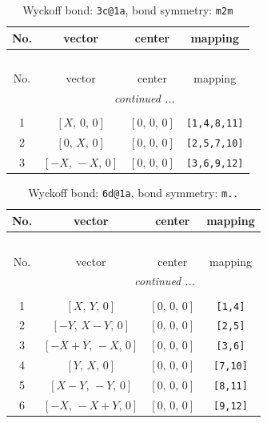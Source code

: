 \documentclass[fleqn,8pt]{jsarticle}
\begin{document}
\renewcommand{\arraystretch}{1.2}
\begin{longtable}{cccc}
\caption{Wyckoff bond: {\tt 3c@1a}, bond symmetry: {\tt m2m}}
 \\
 \hline \hline
No. & vector & center & mapping \\ \hline \endfirsthead

\multicolumn{3}{l}{\tablename\ \thetable{}} \\
 \hline \hline
No. & vector & center & mapping \\ \hline \endhead

 \hline \hline
\multicolumn{3}{r}{\footnotesize\it continued ...} \\ \endfoot

 \hline \hline
\multicolumn{3}{r}{} \\ \endlastfoot

1 & $\left[ X,\, 0,\, 0 \right]$ & $\left[ 0,\, 0,\, 0 \right]$ & {\tt [1,4,8,11]} \\ \hline
2 & $\left[ 0,\, X,\, 0 \right]$ & $\left[ 0,\, 0,\, 0 \right]$ & {\tt [2,5,7,10]} \\ \hline
3 & $\left[ - X,\, - X,\, 0 \right]$ & $\left[ 0,\, 0,\, 0 \right]$ & {\tt [3,6,9,12]} \\
\end{longtable}
\renewcommand{\arraystretch}{1.2}
\begin{longtable}{cccc}
\caption{Wyckoff bond: {\tt 6d@1a}, bond symmetry: {\tt m..}}
 \\
 \hline \hline
No. & vector & center & mapping \\ \hline \endfirsthead

\multicolumn{3}{l}{\tablename\ \thetable{}} \\
 \hline \hline
No. & vector & center & mapping \\ \hline \endhead

 \hline \hline
\multicolumn{3}{r}{\footnotesize\it continued ...} \\ \endfoot

 \hline \hline
\multicolumn{3}{r}{} \\ \endlastfoot

1 & $\left[ X,\, Y,\, 0 \right]$ & $\left[ 0,\, 0,\, 0 \right]$ & {\tt [1,4]} \\ \hline
2 & $\left[ - Y,\, X - Y,\, 0 \right]$ & $\left[ 0,\, 0,\, 0 \right]$ & {\tt [2,5]} \\ \hline
3 & $\left[ - X + Y,\, - X,\, 0 \right]$ & $\left[ 0,\, 0,\, 0 \right]$ & {\tt [3,6]} \\ \hline
4 & $\left[ Y,\, X,\, 0 \right]$ & $\left[ 0,\, 0,\, 0 \right]$ & {\tt [7,10]} \\ \hline
5 & $\left[ X - Y,\, - Y,\, 0 \right]$ & $\left[ 0,\, 0,\, 0 \right]$ & {\tt [8,11]} \\ \hline
6 & $\left[ - X,\, - X + Y,\, 0 \right]$ & $\left[ 0,\, 0,\, 0 \right]$ & {\tt [9,12]} \\
\end{longtable}
\end{document}

